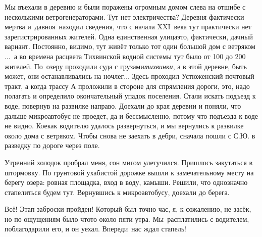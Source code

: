 Мы въехали в деревню и были поражены огромным домом слева на отшибе с несколькими ветрогенераторами. Тут нет электричества? Деревня фактически мертва и~давно\mdash я~находил сведения, что с начала XXI~века тут практически нет зарегистрированных жителей. Одна единственная улица\mdash это, фактически, дачный вариант. Постоянно, видимо, тут живёт только тот один большой дом с ветряком$\ldots$~а во времена расцвета Тихвинской водной системы тут было от 100 до 200 жителей. По~озеру проходили суда с грузами\mdash \textit{тихвинки}, а в этой деревне, быть может, они останавливались на ночлег$\ldots$ Здесь проходил Устюженский почтовый тракт, а когда трассу А проложили в стороне для спрямления дороги, это, надо полагать и определило окончательный упадок поселения.
\newpage
Стали искать подъезд к воде, повернув на развилке направо. Доехали до края деревни и поняли, что дальше микроавтобус не проедет, да и бессмысленно, потому что подъезда к воде не видно. Кое\sdash как водителю удалось развернуться, и мы вернулись к развилке около дома с ветряком. Чтобы снова не заехать в дебри, сначала пошли с С.Ю. в разведку по дороге через поле. 

Утренний холодок пробрал меня, сон мигом улетучился. Пришлось закутаться в штормовку. По грунтовой ухабистой дорожке вышли к замечательному месту на берегу озера: ровная площадка, вход в воду, камыши. Решили, что однозначно стапелиться будем тут. Вернувшись к микроавтобусу, доехали до берега. 

Всё! Этап заброски пройден! Который был точно час, я, к сожалению, не засёк, но по ощущениям было что\sdash то около пяти утра. Мы~расплатились с водителем, поблагодарили его, и он уехал. Впереди~нас ждал стапель!

\begin{center}
\end{center}
